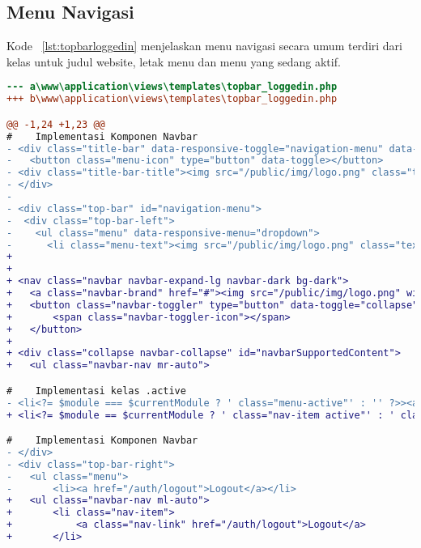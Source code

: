 \subsection{Menu Navigasi}
Kode ~\ref{lst:topbarloggedin} menjelaskan menu navigasi secara umum terdiri dari kelas untuk judul website, letak menu dan menu yang sedang aktif.
\begin{lstlisting}[language=diff, caption=Perubahan file \path{\views\templates\topbar_loggedin.php} ,  basicstyle=\ttfamily, frame=single,
columns=fullflexible, keepspaces=true, breaklines=true, label={lst:topbarloggedin}]
--- a\www\application\views\templates\topbar_loggedin.php
+++ b\www\application\views\templates\topbar_loggedin.php

@@ -1,24 +1,23 @@
#    Implementasi Komponen Navbar
- <div class="title-bar" data-responsive-toggle="navigation-menu" data-hide-for="medium">
- 	<button class="menu-icon" type="button" data-toggle></button>
- <div class="title-bar-title"><img src="/public/img/logo.png" class="textsized" alt="B"/></div>
- </div>
-
- <div class="top-bar" id="navigation-menu">
-  <div class="top-bar-left">
-    <ul class="menu" data-responsive-menu="dropdown">
-      <li class="menu-text"><img src="/public/img/logo.png" class="textsized" alt="B"/></li>
+ 		
+ 			
+ <nav class="navbar navbar-expand-lg navbar-dark bg-dark">
+   <a class="navbar-brand" href="#"><img src="/public/img/logo.png" width="50"/></a>
+ 	<button class="navbar-toggler" type="button" data-toggle="collapse" data-target="#navbarSupportedContent" aria-controls="navbarSupportedContent" aria-expanded="false" aria-label="Toggle navigation">
+ 		<span class="navbar-toggler-icon"></span>
+ 	</button>
+ 		
+ <div class="collapse navbar-collapse" id="navbarSupportedContent">
+ 	<ul class="navbar-nav mr-auto">

#    Implementasi kelas .active
- <li<?= $module === $currentModule ? ' class="menu-active"' : '' ?>><a href="/<?= $module ?>"><?= $this->config->item('module-names')[$module] ?></a></li>
+ <li<?= $module == $currentModule ? ' class="nav-item active"' : ' class="nav-item "' ?>><a class="nav-link" href="/<?= $module ?>"><?= $this->config->item('module-names')[$module] ?></a></li>

#    Implementasi Komponen Navbar
- </div>
- <div class="top-bar-right">
- 	<ul class="menu">
- 		<li><a href="/auth/logout">Logout</a></li>
+ 	<ul class="navbar-nav ml-auto">
+ 		<li class="nav-item">
+ 		    <a class="nav-link" href="/auth/logout">Logout</a>
+ 		</li>

\end{lstlisting}

